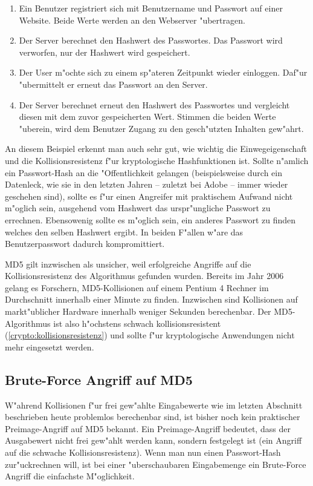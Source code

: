 \begin{refsection}
\begin{enumerate}
		\item Ein Benutzer registriert sich mit Benutzername und Passwort auf einer
			Website. Beide Werte werden an den Webserver "ubertragen.
		\item Der Server berechnet den Hashwert des Passwortes. Das Passwort wird
			verworfen, nur der Hashwert wird gespeichert.
		\item Der User m"ochte sich zu einem sp"ateren Zeitpunkt wieder einloggen.
			Daf"ur "ubermittelt er erneut das Passwort an den Server.
		\item Der Server berechnet erneut den Hashwert des Passwortes und
			vergleicht diesen mit dem zuvor gespeicherten Wert. Stimmen die beiden
			Werte "uberein, wird dem Benutzer Zugang zu den gesch"utzten Inhalten
			gew"ahrt.
\end{enumerate}

An diesem Beispiel erkennt man auch sehr gut, wie wichtig die Einwegeigenschaft
und die Kollisionsresistenz f"ur kryptologische Hashfunktionen ist. Sollte
n"amlich ein Passwort-Hash an die "Offentlichkeit gelangen (beispielsweise durch
ein Datenleck, wie sie in den letzten Jahren -- zuletzt bei Adobe -- immer
wieder geschehen sind), sollte es f"ur einen Angreifer mit praktischem Aufwand
nicht m"oglich sein, ausgehend vom Hashwert das urspr"ungliche Passwort zu
errechnen. Ebensowenig sollte es m"oglich sein, ein anderes Passwort zu finden
welches den selben Hashwert ergibt. In beiden F"allen w"are das Benutzerpasswort
dadurch kompromittiert.

MD5 gilt inzwischen als unsicher, weil erfolgreiche Angriffe auf die
Kollisionsresistenz des Algorithmus gefunden wurden. Bereits im Jahr 2006 gelang
es Forschern, MD5-Kollisionen auf einem Pentium 4 Rechner im Durchschnitt
innerhalb einer Minute zu finden\cite{crypto:stevens2006fast}. Inzwischen sind
Kollisionen auf markt"ublicher Hardware innerhalb weniger Sekunden berechenbar.
Der MD5-Algorithmus ist also h"ochstens schwach kollisionsresistent
(\ref{crypto:kollisionsresistenz}) und sollte f"ur kryptologische Anwendungen
nicht mehr eingesetzt werden.

\subsection{Brute-Force Angriff auf MD5}

W"ahrend Kollisionen f"ur frei gew"ahlte Eingabewerte wie im letzten Abschnitt
beschrieben heute problemlos berechenbar sind, ist bisher noch kein praktischer
Preimage-Angriff auf MD5 bekannt. Ein Preimage-Angriff bedeutet, dass der
Ausgabewert nicht frei gew"ahlt werden kann, sondern festgelegt ist (ein Angriff
auf die schwache Kollisionsresistenz). Wenn man nun einen Passwort-Hash
zur"uckrechnen will, ist bei einer "uberschaubaren Eingabemenge ein Brute-Force
Angriff die einfachste M"oglichkeit.


\end{refsection}
